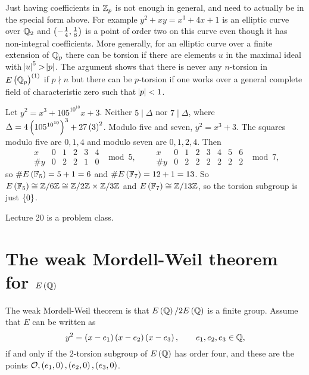 \begin{remark}
Just having coefficients in $ \mathbb{Z}_p $ is not enough in general, and need to actually be in the special form above. For example $ y^2 + xy = x^3 + 4x + 1 $ is an elliptic curve over $ \mathbb{Q}_2 $ and $ \br{-\tfrac{1}{4}, \tfrac{1}{8}} $ is a point of order two on this curve even though it has non-integral coefficients. More generally, for an elliptic curve over a finite extension of $ \mathbb{Q}_p $ there can be torsion if there are elements $ u $ in the maximal ideal with $ \abs{u}^5 > \abs{p} $. The argument shows that there is never any $ n $-torsion in $ E\br{\QQ_p}^{\br{1}} $ if $ p \nmid n $ but there can be $ p $-torsion if one works over a general complete field of characteristic zero such that $ \abs{p} < 1 $.
\end{remark}

\begin{example}
Let $ y^2 = x^3 + 105^{10^{10}}x + 3 $. Neither $ 5 \mid \Delta $ nor $ 7 \mid \Delta $, where $ \Delta = 4\br{105^{10^{10}}}^3 + 27\br{3}^2 $. Modulo five and seven, $ y^2 = x^3 + 3 $. The squares modulo five are $ 0, 1, 4 $ and modulo seven are $ 0, 1, 2, 4 $. Then
$$
\begin{array}{c|c|c|c|c|c}
x & 0 & 1 & 2 & 3 & 4 \\
\hline
\#y & 0 & 2 & 2 & 1 & 0
\end{array}
\mod 5, \qquad
\begin{array}{c|c|c|c|c|c|c|c}
x & 0 & 1 & 2 & 3 & 4 & 5 & 6 \\
\hline
\#y & 0 & 2 & 2 & 2 & 2 & 2 & 2
\end{array}
\mod 7,
$$
so $ \#E\br{\FF_5} = 5 + 1 = 6 $ and $ \#E\br{\FF_7} = 12 + 1 = 13 $. So $ E\br{\FF_5} \cong \ZZ / 6\ZZ \cong \ZZ / 2\ZZ \times \ZZ / 3\ZZ $ and $ E\br{\FF_7} \cong \ZZ / 13\ZZ $, so the torsion subgroup is just $ \cbr{0} $.
\end{example}


Lecture 20 is a problem class.

\pagebreak

\section{The weak Mordell-Weil theorem for \texorpdfstring{$ E\br{\QQ} $}{E(Q)}}


The weak Mordell-Weil theorem is that $ E\br{\QQ} / 2E\br{\QQ} $ is a finite group. Assume that $ E $ can be written as
$$ y^2 = \br{x - e_1}\br{x - e_2}\br{x - e_3}, \qquad e_1, e_2, e_3 \in \QQ, $$
if and only if the $ 2 $-torsion subgroup of $ E\br{\QQ} $ has order four, and these are the points $ \OOO, \br{e_1, 0}, \br{e_2, 0}, \br{e_3, 0} $.

